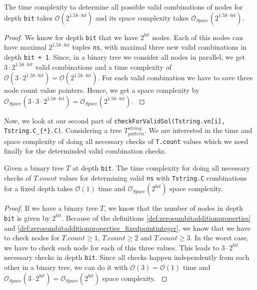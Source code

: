 \begin{lemma}
    The time complexity to determine all possible valid combinations of nodes for depth \texttt{bit} takes $\mathcal{O}\left(2^{1.58 \cdot bit}\right)$ and its space complexity takes $\mathcal{O}_{Space}\left(2^{1.58 \cdot bit}\right)$.
\label{lemma:complexityvalidcombdet}
\end{lemma}


\begin{proof}
    We know for depth \texttt{bit} that we have $2^{bit}$ nodes. Each of this nodes can have maximal $2^{1.58 \cdot bit}$ tuples \texttt{ns}, with maximal three new valid combinations in depth \texttt{bit + 1}. Since, in a binary tree we consider all nodes in parallel, we get $3 \cdot 2^{1.58 \cdot bit}$ valid combinations and a time complexity of $\mathcal{O}\left(3 \cdot 2^{1.58 \cdot bit}\right) = \mathcal{O}\left(2^{1.58 \cdot bit}\right)$. For each valid combination we have to save three node count value pointers. Hence, we get a space complexity by $\mathcal{O}_{Space}\left(3 \cdot 3 \cdot 2^{1.58 \cdot bit}\right) = \mathcal{O}_{Space}\left(2^{1.58 \cdot bit}\right)$.
\label{proof:complexityvalidcombdet}
\end{proof}

Now, we look at our second part of \texttt{checkForValidSol(Tstring.vn[i], Tstring.C\_\{*\}.C)}. Considering a tree $T^{string}_{pattern}$. We are interested in the time and space complexity of doing all necessary checks of \texttt{T.count} values which we need finally for the determinded valid combination checks.

\begin{lemma}
    Given a binary tree $T$ at depth \texttt{bit}. The time complexity for doing all necessary checks of $T.count$ values for determining valid \texttt{ns} with \texttt{Tstring.C} combinations for a fixed depth takes $\mathcal{O}\left(1\right)$ time and $\mathcal{O}_{Space}\left(2^{bit}\right)$ space complexity.
\label{lemma:Tdscountcomplexities}
\end{lemma}

\begin{proof}  
    If we have a binary tree $T$, we know that the number of nodes in depth \texttt{bit} is given by $2^{bit}$. Because of the definitions \ref{def:zerosumbitadditionproperties} and \ref{def:zerosumbitadditionproperties_fixedpointinteger}, we know that we have to check nodes for $T.count \geq 1$, $T.count \geq 2$ and $T.count \geq 3$. In the worst case, we have to check each node for each of this three values. This leads to $3 \cdot 2^{bit}$ necessary checks in depth \texttt{bit}. Since all checks happen independently from each other in a binary tree, we can do it with $\mathcal{O}\left(3\right) = \mathcal{O}\left(1\right)$ time and $\mathcal{O}_{Space}\left(3 \cdot 2^{bit}\right) = \mathcal{O}_{Space}\left(2^{bit}\right)$ space complexity.
\label{proof:Tdscountcomplexity}
\end{proof}

